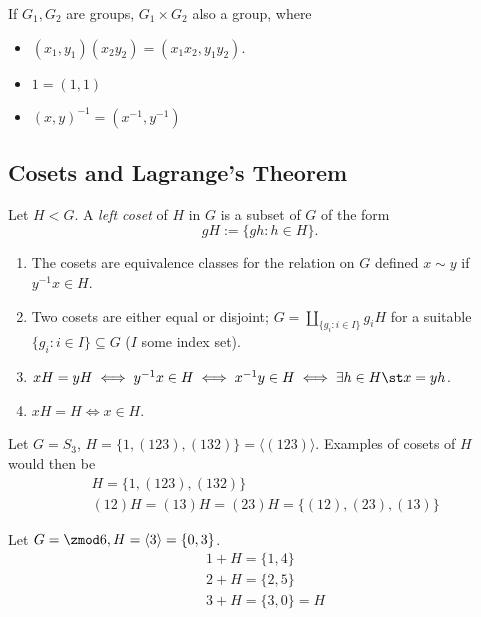 \documentclass[12pt,oneside]{article}
\begin{document}
\begin{definition}
  If $G_1, G_2$ are groups, $G_1 \times G_2$ also a group, where 
  \begin{itemize}
    \item $(x_1, y_1)(x_2y_2) = (x_1x_2, y_1y_2)$. 
    \item $1 = (1,1)$
    \item $(x,y)^{-1} = (x^{-1}, y^{-1})$
  \end{itemize}
\end{definition}

\newpage
\subsection{Cosets and Lagrange's Theorem}

\begin{definition}
  Let $H < G$. A \emph{left coset} of $H$ in $G$ is a subset of $G$ of the form $$gH := \{g h : h \in H \}.$$
\end{definition}

\begin{lemma}\label{lemma:cosets1}
  \begin{enumerate}
    \item The cosets are equivalence classes for the relation on $G$ defined $x \sim y$ if $y^{-1}x \in H$.
    \item Two cosets are either equal or disjoint; $G = \amalg_{\{g_i : i \in I\}} g_i H$ for a suitable $\{g_i : i \in I\} \subseteq G$ ($I$ some index set).
    \item $xH = yH \iff y^{-1}x \in H \iff x^{-1}y \in H \iff \exists h \in H \st x = yh$.
    \item $xH = H \iff x \in H$.
  \end{enumerate}
\end{lemma}

\begin{example}[$S_3$]
  Let $G = S_3$, $H = \{1, (123), (132)\} = \langle (123)\rangle$. Examples of cosets of $H$ would then be \begin{align*}
    &H = \{1, (123), (132)\}\\
    &(12)H = (13)H = (23)H = \{(12), (23), (13)\}
  \end{align*}
\end{example}

\begin{example}
  Let $G = \zmod 6, H = \langle 3 \rangle = \{0, 3\}$. \begin{align*}
    &1 + H = \{1, 4\}\\
    &2 + H = \{2, 5\}\\
    &3 + H = \{3, 0\} = H
  \end{align*}
\end{example}
\end{document}
